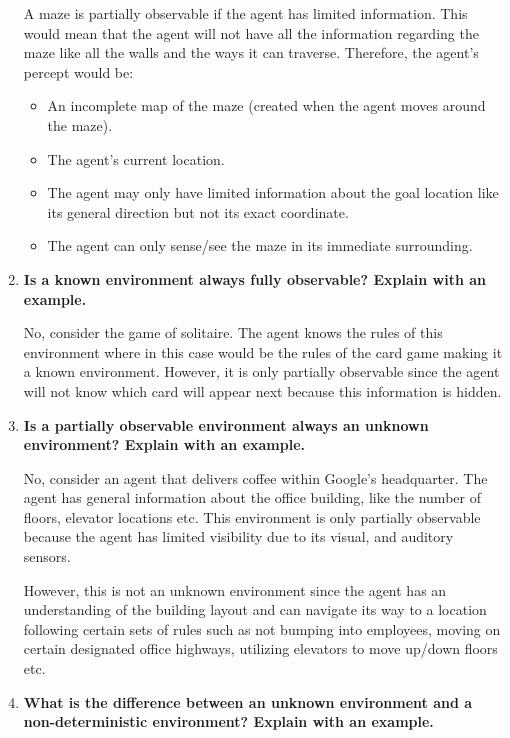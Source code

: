 \documentclass[a4paper]{article}
\begin{document}
\begin{sloppypar}
\begin{enumerate}[start=1,label=Q\arabic*,left=0pt]
    \par A maze is partially observable if the agent has limited information. This would mean that the agent
    will not have all the information regarding the maze like all the walls and the ways it can traverse. Therefore,
    the agent's percept would be:
    \begin{itemize}
        \item An incomplete map of the maze (created when the agent moves around the maze).
        \item The agent's current location.
        \item The agent may only have limited information about the goal location like its general direction but not its exact coordinate.
        \item The agent can only sense/see the maze in its immediate surrounding.
    \end{itemize}
    
    \item \textbf{Is a known environment always fully observable? Explain with an example.}
    
    \par No, consider the game of solitaire. The agent knows the rules of this environment where in this case would be the rules
    of the card game making it a known environment. However, it is only partially observable since the agent will not know which card will
    appear next because this information is hidden.
    
    \item \textbf{Is a partially observable environment always an unknown environment? Explain with an example.}
    
    \par No, consider an agent that delivers coffee within Google's headquarter. The agent has general information about the office building,
    like the number of floors, elevator locations etc. This environment is only partially observable because the agent has limited visibility due to
    its visual, and auditory sensors. 
    
    However, this is not an unknown environment since the agent has an understanding of the building layout and
    can navigate its way to a location following certain sets of rules such as not bumping into employees, moving on certain designated office highways,
    utilizing elevators to move up/down floors etc.

    \item \textbf{What is the difference between an unknown environment and a non-deterministic environment? Explain with an example.}
    

\end{enumerate}
\end{sloppypar}
\end{document}
